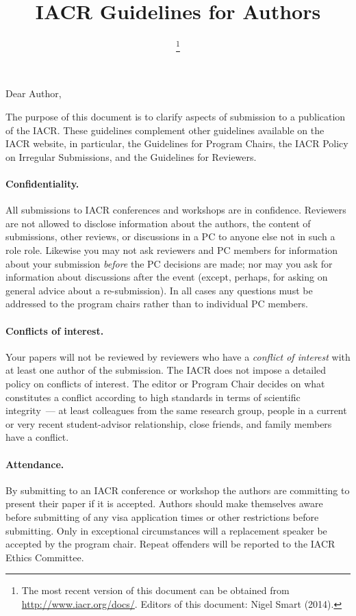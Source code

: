 \documentclass[11pt]{article}
\title{\bf IACR Guidelines for Authors}
\author{\mbox{}}
\date{\lastupdate
 \footnote{The most recent version of this document
    can be obtained from \protect\url{http://www.iacr.org/docs/}.\newline
  Editors of this document: Nigel Smart (2014).}}
\begin{document}
\pagestyle{fancy}

\maketitle

\noindent Dear Author,
\vspace*{4mm}
\par\noindent
The purpose of this document is to clarify aspects of submission 
to a publication of the IACR.
%
These guidelines complement other guidelines available on the IACR
website, in particular, the Guidelines for Program Chairs, the IACR
Policy on Irregular Submissions, and the Guidelines for Reviewers.


\paragraph{Confidentiality.}
All submissions to IACR conferences and workshops are in confidence.
Reviewers are not allowed to disclose information about the authors, the
content of submissions, other reviews, or discussions in a PC to
anyone else not in such a role role.
Likewise you may not ask reviewers and PC members for information
about your submission \emph{before} the PC decisions are made; nor may
you ask for information about discussions after the event (except, perhaps,
for asking on general advice about a re-submission).
In all cases any questions must be addressed to the program chairs
rather than to individual PC members.

\paragraph{Conflicts of interest.}
Your papers will not be reviewed by reviewers who have a \emph{conflict of
  interest} with at least one author of the submission.  The IACR does
not impose a detailed policy on conflicts of interest.  The editor or
Program Chair decides on what constitutes a conflict according to high
standards in terms of scientific integrity~--- at least colleagues
from the same research group, people in a current or very recent
student-advisor relationship, close friends, and family members have a
conflict.

\paragraph{Attendance.}
By submitting to an IACR conference or workshop the authors are
committing to present their paper if it is accepted. Authors should
make themselves aware before submitting of any visa application
times or other restrictions before submitting.
Only in exceptional circumstances will a replacement speaker
be accepted by the program chair. 
Repeat offenders will be reported to the IACR Ethics Committee.
\end{document}
